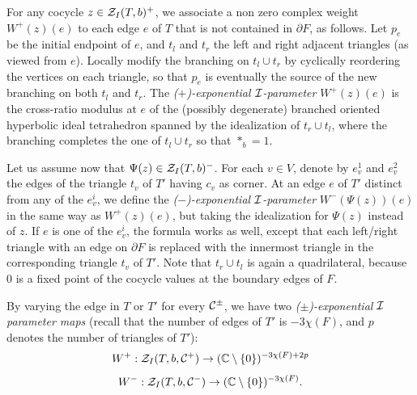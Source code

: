 \smallskip

  For any cocycle $z
\in {\mathcal Z}_I(T,b)^+$, we associate a non zero complex weight
$W^+(z)(e)$ to each edge $e$ of $T$ that is not contained in
$\partial F$, as follows. Let $p_e$ be the initial endpoint of
$e$, and $t_l$ and $t_r$ the left and right adjacent triangles (as
viewed from $e$). Locally modify the branching on $t_l \cup t_r$
by cyclically reordering the vertices on each triangle, so that
$p_e$ is eventually the source of the new branching on both $t_l$
and $t_r$. The {\it ($+$)-exponential ${\mathcal I}$-parameter} $W^+(z)(e)$
is the cross-ratio modulus at $e$ of the (possibly degenerate)
branched oriented hyperbolic ideal tetrahedron spanned by the
idealization of $t_r \cup t_l$, where the branching completes the
one of $t_l \cup t_r$ so that $*_b=1$. %
\smallskip

Let us assume now that $\Psi(z)\in {\mathcal Z}_I(T,b)^-$. For each $v \in V$,
denote by $e_v^1$ and $e_v^2$ the edges of the triangle $t_v$ of $T'$
having $c_v$ as corner. At an edge $e$ of $T'$ distinct from any of
the $e_v^i$, we define the {\it ($-$)-exponential ${\mathcal I}$-parameter}
$W^-(\Psi(z))(e)$ in the same way as $W^+(z)(e)$, but taking
the idealization for $\Psi(z)$ instead of $z$. If $e$ is one of the
$e_v^i$, the formula works as well, except that each left/right
triangle with an edge on $\partial F$ is replaced with the innermost
triangle in the corresponding triangle $t_v$ of $T'$. Note that $t_r
\cup t_l$ is again a quadrilateral, because $0$ is a fixed point of
the cocycle values at the boundary edges of $F$.
\smallskip

By varying the edge in $T$ or $T'$ for every ${\mathcal C}^\pm$, we have two
{\it ($\pm$)-exponential ${\mathcal I}$ parameter maps}
(recall that the number of edges of $T'$ is $ -3\chi(F)$, and $p$
denotes the number of triangles of $T'$):
$$W^+: {\mathcal Z}_I(T,b,\mathcal{C}^+)
    \rightarrow (\mathbb{C} \setminus \{ 0\})^{-3\chi(F)+2p}$$
$$W^-: {\mathcal Z}_I(T,b,\mathcal{C}^-) \rightarrow (\mathbb{C} \setminus \{ 0
    \})^{-3\chi(F)}.$$

